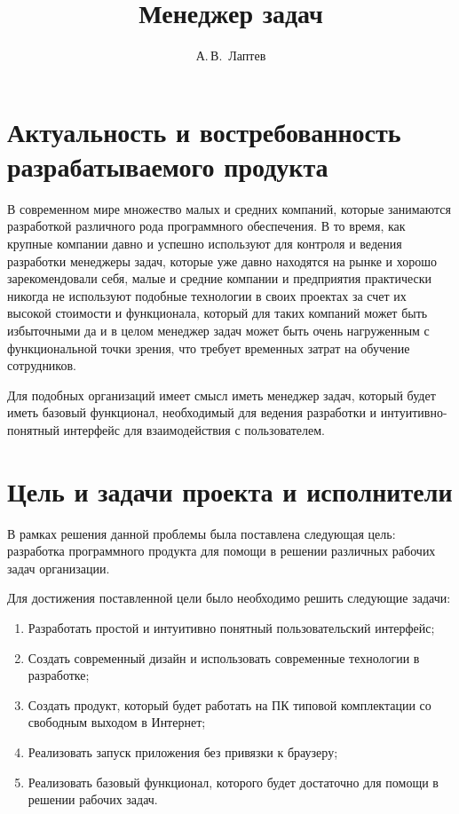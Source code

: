 \documentclass{altsu-report}
\title{Менеджер задач}
\author{А.\,В.~Лаптев}
\begin{document}
\setcounter{page}{3}
\tableofcontents

\chapter{Актуальность и востребованность разрабатываемого продукта}

В современном мире множество малых и средних компаний, которые занимаются разработкой различного рода программного обеспечения. В то время, как крупные компании давно и успешно используют для контроля и ведения разработки менеджеры задач, которые уже давно находятся на рынке и хорошо зарекомендовали себя, малые и средние компании и предприятия практически никогда не используют подобные технологии в своих проектах за счет их высокой стоимости и функционала, который для таких компаний может быть избыточными да и в целом менеджер задач может быть очень нагруженным с функциональной точки зрения, что требует временных затрат на обучение сотрудников.

Для подобных организаций имеет смысл иметь менеджер задач, который будет иметь базовый функционал, необходимый для ведения разработки и интуитивно-понятный интерфейс для взаимодействия с пользователем.

\chapter{Цель и задачи проекта и исполнители}

В рамках решения данной проблемы была поставлена следующая цель: разработка программного продукта для помощи в решении различных рабочих задач организации.

Для достижения поставленной цели было необходимо решить следующие задачи:

\begin{enumerate}
    \item Разработать простой и интуитивно понятный пользовательский интерфейс;
    \item Создать современный дизайн и использовать современные технологии в разработке;
    \item Создать продукт, который будет работать на ПК типовой комплектации со свободным выходом в Интернет;
    \item Реализовать запуск приложения без привязки к браузеру;
    \item Реализовать базовый функционал, которого будет достаточно для помощи в решении рабочих задач.
\end{enumerate}
\end{document}
